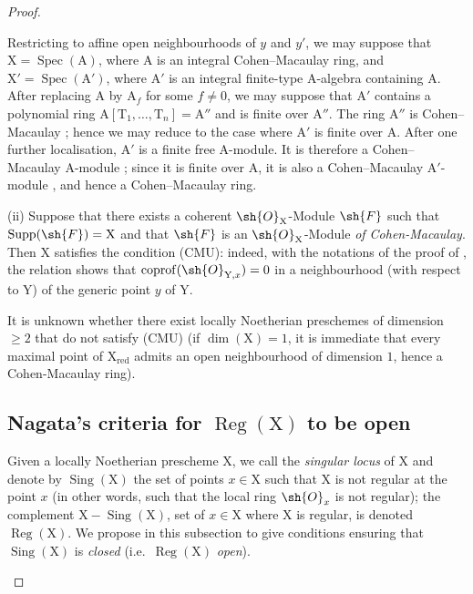 \begin{proof}
\begin{remarks}[6.11.9]
Restricting to affine open neighbourhoods of $y$ and $y'$, we may suppose that $\mathrm{X}=\operatorname{Spec}(\mathrm{A})$, where $\mathrm{A}$ is an integral Cohen--Macaulay ring, and $\mathrm{X}'=\operatorname{Spec}(\mathrm{A}')$, where $\mathrm{A}'$ is an integral finite-type $\mathrm{A}$-algebra containing $\mathrm{A}$.
After replacing $\mathrm{A}$ by $\mathrm{A}_f$ for some $f\neq 0$, we may suppose that $\mathrm{A}'$ contains a polynomial ring $\mathrm{A}[\mathrm{T}_1,\ldots,\mathrm{T}_n]=\mathrm{A}''$ and is finite over $\mathrm{A}''$. The ring $\mathrm{A}''$ is Cohen--Macaulay ; hence we may reduce to the case where $\mathrm{A}'$ is finite over $\mathrm{A}$. After one further localisation, $\mathrm{A}'$ is a finite free $\mathrm{A}$-module. It is therefore a Cohen--Macaulay $\mathrm{A}$-module ; since it is finite over $\mathrm{A}$, it is also a Cohen--Macaulay $\mathrm{A}'$-module , and hence a Cohen--Macaulay ring.

(ii) Suppose that there exists a coherent $\sh{O}_\mathrm{X}$-Module $\sh{F}$ such that $\operatorname{Supp}(\sh{F})=\mathrm{X}$ and that $\sh{F}$ is an $\sh{O}_\mathrm{X}$-Module
\emph{of Cohen-Macaulay}. Then $\mathrm{X}$ satisfies the condition (CMU): indeed, with the notations of the proof of ,
the relation  shows that $\operatorname{coprof}(\sh{O}_{\mathrm{Y},x})=0$ in a neighbourhood (with respect to $\mathrm{Y}$) of the
generic point $y$ of $\mathrm{Y}$.

It is unknown whether there exist locally Noetherian preschemes of dimension $\geqslant 2$ that do not satisfy (CMU)
(if $\dim(\mathrm{X})=1$, it is immediate that every maximal point of $\mathrm{X}_{\mathrm{red}}$ admits an open neighbourhood of dimension $1$,
hence a Cohen-Macaulay ring).
\end{remarks}

\subsection{Nagata's criteria for \texorpdfstring{$\operatorname{Reg}(\mathrm{X})$}{Reg(X)} to be open}
\label{subsection:IV.6.12}
\label{IV.6.12}

\begin{env}[6.12.1]
\label{IV.6.12.1}
Given a locally Noetherian prescheme $\mathrm{X}$, we call the \emph{singular
locus} of $\mathrm{X}$ and denote by $\operatorname{Sing}(\mathrm{X})$ the set of points $x\in\mathrm{X}$ such that $\mathrm{X}$ is not
regular at the point $x$ (in other words, such that the local ring $\sh{O}_x$ is not regular); the
complement $\mathrm{X}-\operatorname{Sing}(\mathrm{X})$, set of $x\in\mathrm{X}$ where $\mathrm{X}$ is regular, is denoted $\operatorname{Reg}(\mathrm{X})$.
We propose in this subsection to give conditions ensuring that
$\operatorname{Sing}(\mathrm{X})$ is \emph{closed} (i.e.\ $\operatorname{Reg}(\mathrm{X})$ \emph{open}).
\end{env}


\end{proof}
